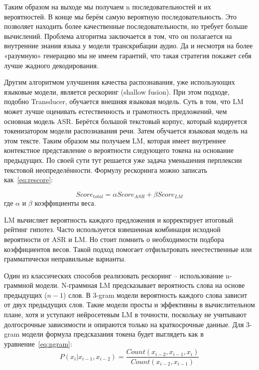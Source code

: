 Таким образом на выходе мы получаем n последовательностей и их вероятностей.
В конце мы берём самую вероятную последовательность.
Это позволяет находить более качественные последовательности, но требует больше вычислений.
Проблема алгоритма заключается в том, что он полагается на внутренние знания языка у модели транскрибации аудио.
Да и несмотря на более «разумную» генерацию мы не имеем гарантий, что такая стратегия покажет себя лучше жадного декодирования.

Другим алгоритмом улучшения качества распознавания, уже использующих языковые модели, является рескоринг (shallow fusion)\cite{toshniwal2018comparison}.
При этом подходе, подобно Transducer, обучается внешняя языковая модель.
Суть в том, что LM может лучше оценивать естественность и грамотность предложений, чем основная модель ASR.
Берётся большой текстовый корпус, который кодируется токенизатором модели распознавания речи.
Затем обучается языковая модель на этом тексте.
Таким образом мы получаем LM, которая имеет внутреннее контекстное представление о вероятности следующего токена на основание предыдущих.
По своей сути тут решается уже задача уменьшения перплексии текстовой неопределённости.
Формулу рескоринга можно записать как~\ref{eq:rescore}:

\begin{equation}
  Score_{total} = \alpha Score_{ASR} + \beta Score_{LM}
  \label{eq:rescore}
\end{equation}
где $\alpha$ и $\beta$ коэффициенты веса.

LM вычисляет вероятность каждого предложения и корректирует итоговый рейтинг гипотез.
Часто используется взвешенная комбинация исходной вероятности от ASR и LM.
Но стоит помнить о необходимости подбора коэффициентов весов.
Такой подход помогает отфильтровать неестественные или грамматически неправильные варианты.

Один из классических способов реализовать рескоринг -- использование n-граммной модели.
N-граммная LM предсказывает вероятность слова на основе предыдущих ($n-1$) слов.
В 3-gram модели вероятность каждого слова зависит от двух предыдущих слов.
Такие модели просты и эффективны в вычислительном плане, хотя и уступают нейросетевым LM в точности, поскольку не учитывают долгосрочные зависимости и опираются только на краткосрочные данные.
Для 3-gram модели формула предсказания токена будет выглядеть как в уравнение~\ref{eq:ngram}:
\begin{equation}
  P(x_i|x_{i-1},x_{i-2}) = \frac{Count(x_{i-2}, x_{i-1}, x_{i})}{Count(x_{i-2}, x_{i-1})}
  \label{eq:ngram}
\end{equation}

